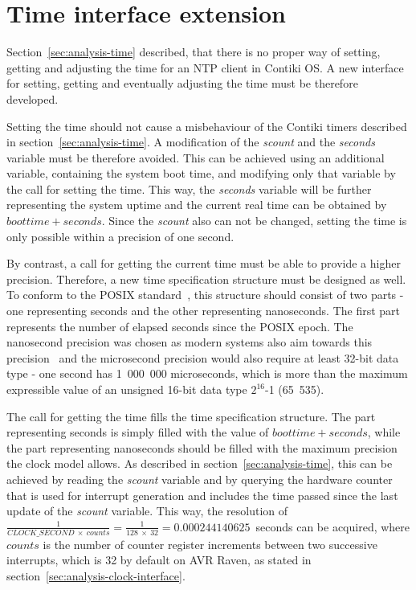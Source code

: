 
\section{Time interface extension}\label{sec:analysis-interface}
Section~\ref{sec:analysis-time} described, that there is no proper
way of setting, getting and adjusting the time for an NTP client in Contiki OS.
A new interface for setting, getting and eventually adjusting the time
must be therefore developed.

Setting the time should not cause a misbehaviour of the Contiki timers
described in section~\ref{sec:analysis-time}.
A modification of the {\it{scount}} and the {\it{seconds}} variable must be therefore avoided.
This can be achieved using an additional variable, containing the system boot time,
and modifying only that variable by the call for setting the time.
This way, the {\it{seconds}} variable will be further representing the system uptime
and the current real time can be obtained by $boottime + seconds$.
Since the {\it{scount}} also can not be changed, setting the time is only possible
within a precision of one second.

By contrast, a call for getting the current time must be able to provide a higher precision.
Therefore, a new time specification structure must be designed as well.
To conform to the POSIX standard~\cite{posix}, this structure should consist of two parts -
one representing seconds and the other representing nanoseconds.
The first part represents the number of elapsed seconds since the POSIX epoch.
The nanosecond precision was chosen as modern systems also aim towards this
precision~\cite{posix,ntp-precision} and
the microsecond precision would also require at least 32-bit data type -
one second has 1~000~000 microseconds, which is more than the maximum expressible value of
an unsigned 16-bit data type $2^{16}$-1 (65~535).

The call for getting the time fills the time specification structure.
The part representing seconds is simply filled with the value of $boottime + seconds$,
while the part representing nanoseconds should be filled with the maximum precision
the clock model allows.
As described in section~\ref{sec:analysis-time},
this can be achieved by reading the {\it{scount}} variable
and by querying the hardware counter that is used for
interrupt generation and includes the time passed since
the last update of the {\it{scount}} variable.
This way, the resolution of
$\frac{1}{CLOCK\_SECOND~\times~counts} = \frac{1}{128~\times~32} = 0.000244140625$~seconds
can be acquired,
where $counts$ is the number of counter register increments between two successive interrupts,
which is 32 by default on AVR Raven, as stated in section~\ref{sec:analysis-clock-interface}.

